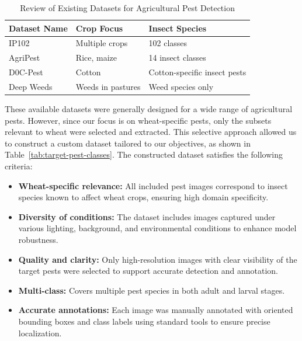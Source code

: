 \begin{table}[htbp]
    \caption{Review of Existing Datasets for Agricultural Pest Detection}
    \centering
    \begin{tabular}{|p{4cm}|p{4cm}|p{5cm}|}
    \hline
    \textbf{Dataset Name} & \textbf{Crop Focus} & \textbf{Insect Species} \\
    \hline
    IP102 & Multiple crops & 102 classes \\
    \hline
    AgriPest & Rice, maize & 14 insect classes \\
    \hline
    D0C-Pest & Cotton & Cotton-specific insect pests \\
    \hline
    Deep Weeds & Weeds in pastures & Weed species only \\
    \hline
    \end{tabular}
    \label{tab:agricultural-pest-datasets}
\end{table}


These available datasets were generally designed for a wide range of agricultural pests. However, since our focus is on wheat-specific pests, only the subsets relevant to wheat were selected and extracted. This selective approach allowed us to construct a custom dataset tailored to our objectives, as shown in Table~\ref{tab:target-pest-classes}. The constructed dataset satisfies the following criteria:

\begin{itemize}
    \item \textbf{Wheat-specific relevance:} All included pest images correspond to insect species known to affect wheat crops, ensuring high domain specificity.
    \item \textbf{Diversity of conditions:} The dataset includes images captured under various lighting, background, and environmental conditions to enhance model robustness.
    \item \textbf{Quality and clarity:} Only high-resolution images with clear visibility of the target pests were selected to support accurate detection and annotation.
    \item \textbf{Multi-class:} Covers multiple pest species in both adult and larval stages.
    \item \textbf{Accurate annotations:} Each image was manually annotated with oriented bounding boxes and class labels using standard tools to ensure precise localization.
\end{itemize}


